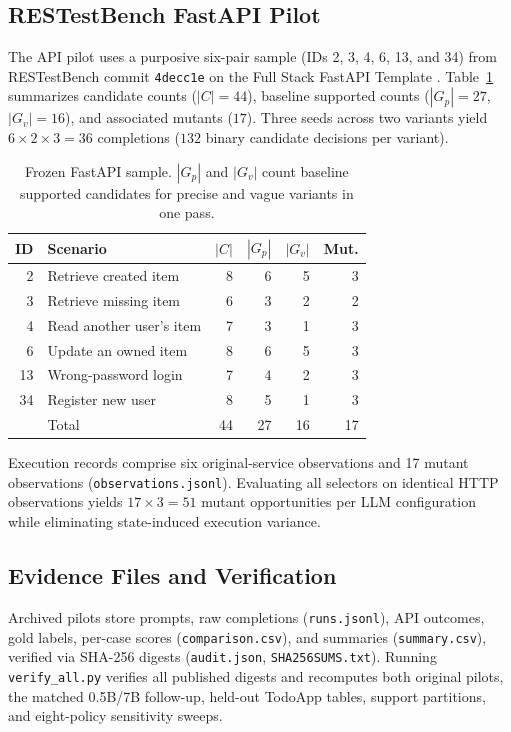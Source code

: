 \documentclass[sigconf,nonacm]{acmart}
\begin{document}
\subsection{RESTestBench FastAPI Pilot}
The API pilot uses a purposive six-pair sample (IDs 2, 3, 4, 6, 13, and 34) from RESTestBench commit \texttt{4decc1e} on the Full Stack FastAPI Template \cite{kogler2026bench,restestrepo,fastapi}. Table~\ref{tab:sample} summarizes candidate counts ($|C|=44$), baseline supported counts ($|G_p|=27$, $|G_v|=16$), and associated mutants ($17$). Three seeds across two variants yield $6\times2\times3=36$ completions ($132$ binary candidate decisions per variant).

\begin{table}[t]
\caption{Frozen FastAPI sample. $|G_p|$ and $|G_v|$ count baseline supported candidates for precise and vague variants in one pass.}
\label{tab:sample}
\centering\small
\begin{tabular}{r l r r r r}
\toprule
ID & Scenario & $|C|$ & $|G_p|$ & $|G_v|$ & Mut.\\
\midrule
2 & Retrieve created item & 8 & 6 & 5 & 3\\
3 & Retrieve missing item & 6 & 3 & 2 & 2\\
4 & Read another user's item & 7 & 3 & 1 & 3\\
6 & Update an owned item & 8 & 6 & 5 & 3\\
13 & Wrong-password login & 7 & 4 & 2 & 3\\
34 & Register new user & 8 & 5 & 1 & 3\\
\midrule
 & Total & 44 & 27 & 16 & 17\\
\bottomrule
\end{tabular}
\end{table}

Execution records comprise six original-service observations and 17 mutant observations (\texttt{observations.jsonl}). Evaluating all selectors on identical HTTP observations yields $17\times3=51$ mutant opportunities per LLM configuration while eliminating state-induced execution variance.

\subsection{Evidence Files and Verification}
Archived pilots store prompts, raw completions (\texttt{runs.jsonl}), API outcomes, gold labels, per-case scores (\texttt{comparison.csv}), and summaries (\texttt{summary.csv}), verified via SHA-256 digests (\texttt{audit.json}, \texttt{SHA256SUMS.txt}). Running \texttt{verify\_all.py} verifies all published digests and recomputes both original pilots, the matched 0.5B/7B follow-up, held-out TodoApp tables, support partitions, and eight-policy sensitivity sweeps.
\end{document}
